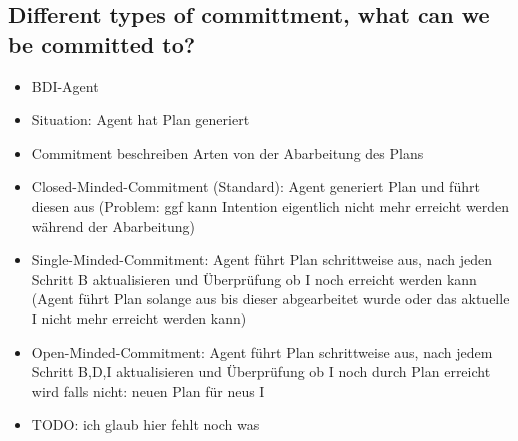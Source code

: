 \subsection{Different types of committment, what can we be committed to?}
\begin{itemize}
	\item BDI-Agent
	\item Situation: Agent hat Plan generiert
	\item Commitment beschreiben Arten von der Abarbeitung des Plans
	\item Closed-Minded-Commitment (Standard): Agent generiert Plan und führt diesen aus (Problem: ggf kann Intention eigentlich nicht mehr erreicht werden während der Abarbeitung)
	\item Single-Minded-Commitment: Agent führt Plan schrittweise aus, nach jeden Schritt B aktualisieren und Überprüfung ob I noch erreicht werden kann (Agent führt Plan solange aus bis dieser abgearbeitet wurde oder das aktuelle I nicht mehr erreicht werden kann)
	\item Open-Minded-Commitment: Agent führt Plan schrittweise aus, nach jedem Schritt B,D,I aktualisieren und Überprüfung ob I noch durch Plan erreicht wird falls nicht: neuen Plan für neus I
	\item TODO: ich glaub hier fehlt noch was
\end{itemize}
